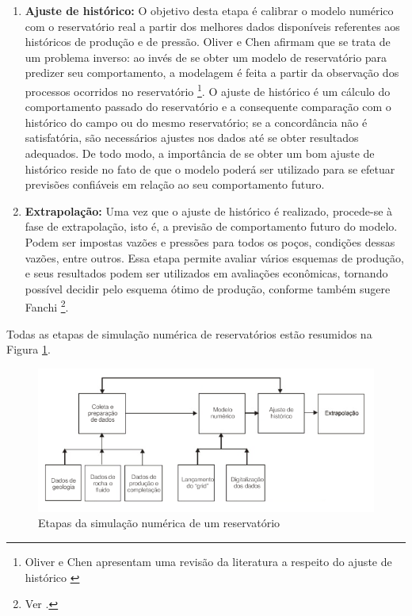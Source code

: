 \begin{enumerate}
\item \textbf{Ajuste de hist\'{o}rico:} O objetivo desta etapa \'{e} calibrar o modelo num\'{e}rico com o reservat\'{o}rio real a partir dos melhores dados dispon\'{i}veis referentes aos hist\'{o}ricos de produ\c{c}\~{a}o e de press\~{a}o. Oliver e Chen afirmam que se trata de um problema inverso: ao inv\'{e}s de se obter um modelo de reservat\'{o}rio para predizer seu comportamento, a modelagem \'{e} feita a partir da observa\c{c}\~{a}o dos processos ocorridos no reservat\'{o}rio \cite{Oliver2011}\footnote{Oliver e Chen apresentam uma revis\~{a}o da literatura a respeito do ajuste de hist\'{o}rico \cite{Oliver2011}}. O ajuste de hist\'{o}rico \'{e} um c\'{a}lculo do comportamento passado do reservat\'{o}rio e a consequente compara\c{c}\~{a}o com o hist\'{o}rico do campo ou do mesmo reservat\'{o}rio; se a concord\^{a}ncia n\~{a}o \'{e} satisfat\'{o}ria, s\~{a}o necess\'{a}rios ajustes nos dados at\'{e} se obter resultados adequados. De todo modo, a import\^{a}ncia de se obter um bom ajuste de hist\'{o}rico reside no fato de que o modelo poder\'{a} ser utilizado para se efetuar previs\~{o}es confi\'{a}veis em rela\c{c}\~{a}o ao seu comportamento futuro.
\item \textbf{Extrapola\c{c}\~{a}o:} Uma vez que o ajuste de hist\'{o}rico \'{e} realizado, procede-se \`{a} fase de extrapola\c{c}\~{a}o, isto \'{e}, a previs\~{a}o de comportamento futuro do modelo. Podem ser impostas vaz\~{o}es e press\~{o}es para todos os po\c{c}os, condi\c{c}\~{o}es dessas vaz\~{o}es, entre outros. Essa etapa permite avaliar v\'{a}rios esquemas de produ\c{c}\~{a}o, e seus resultados podem ser utilizados em avalia\c{c}\~{o}es econ\^{o}micas, tornando poss\'{i}vel decidir pelo esquema \'{o}timo de produ\c{c}\~{a}o, conforme tamb\'{e}m sugere Fanchi \footnote{Ver \cite[p. 373]{fanchi}.}.
\end{enumerate}

Todas as etapas de simula\c{c}\~{a}o num\'{e}rica de reservat\'{o}rios est\~{a}o resumidos na Figura \ref{fig:revisao_simsec2}.

\begin{figure}[!ht]
	\centering
	\includegraphics[width=.75\textwidth]{figs/revisao/revisao_simsec2}
	\caption{Etapas da simula\c{c}\~{a}o num\'{e}rica de um reservat\'{o}rio \cite[p. 523]{engres}}
	\label{fig:revisao_simsec2}
\end{figure}